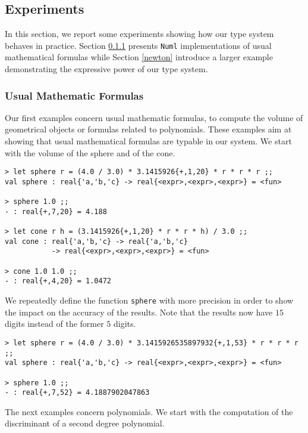 
\subsection{Experiments}
\label{morex}

In this section, we report some experiments showing how our type system behaves in practice.
Section \ref{sssusmath} presents \texttt{Numl} implementations of usual mathematical formulas
while Section \ref{newton} introduce a larger example demonstrating the
expressive power of our type system.

\subsubsection{Usual Mathematic Formulas}
\label{sssusmath}

Our first examples concern usual mathematic formulas, to compute the volume of 
geometrical objects or formulas related to polynomials. 
These examples aim at showing that usual mathematical formulas are typable in our system.
We start with the volume of the sphere and of the cone.

\begin{verbatim}
> let sphere r = (4.0 / 3.0) * 3.1415926{+,1,20} * r * r * r ;;
val sphere : real{'a,'b,'c} -> real{<expr>,<expr>,<expr>} = <fun>

> sphere 1.0 ;;
- : real{+,7,20} = 4.188

> let cone r h = (3.1415926{+,1,20} * r * r * h) / 3.0 ;;
val cone : real{'a,'b,'c} -> real{'a,'b,'c} 
           -> real{<expr>,<expr>,<expr>} = <fun>

> cone 1.0 1.0 ;;
- : real{+,4,20} = 1.0472
\end{verbatim}

We repeatedly define the function \texttt{sphere}  with more precision in order
to show the impact on the accuracy of the results. Note that the results now have $15$ digits instead
of the former $5$ digits.

\begin{verbatim}
> let sphere r = (4.0 / 3.0) * 3.1415926535897932{+,1,53} * r * r * r ;;
val sphere : real{'a,'b,'c} -> real{<expr>,<expr>,<expr>} = <fun>

> sphere 1.0 ;; 
- : real{+,7,52} = 4.1887902047863
\end{verbatim}


The next examples concern polynomials. We start with 
 the computation of the discriminant of a second degree polynomial.

